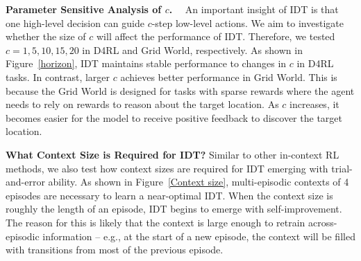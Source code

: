 \noindent\textbf{Parameter Sensitive Analysis of $c$.}~~
An important insight of IDT is that one high-level decision can guide $c$-step low-level actions. We aim to investigate whether the size of $c$ will affect the performance of IDT. Therefore, we tested $c=1,5,10,15,20$ in D4RL and Grid World, respectively. As shown in Figure~\ref{horizon}, IDT maintains stable performance to changes in $c$ in D4RL tasks. In contrast, larger $c$ achieves better performance in Grid World. This is because the Grid World is designed for tasks with sparse rewards where the agent needs to rely on rewards to reason about the target location. As $c$ increases, it becomes easier for the model to receive positive feedback to discover the target location.

\noindent\textbf{What Context Size is Required for IDT?} Similar to other in-context RL methods, we also test how context sizes are required for IDT emerging with trial-and-error ability. As shown in Figure~\ref{Context size}, multi-episodic contexts of 4 episodes are necessary to learn a near-optimal IDT. When the context size is roughly the length of an episode, IDT begins to emerge with self-improvement. The reason for this is likely that the context is large enough to retrain across-episodic information – e.g., at the start of a new episode, the context will be filled with transitions from most of the previous episode.



